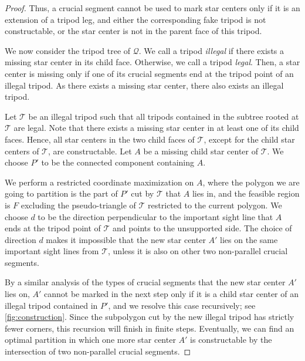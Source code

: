 \documentclass{theoretics}
\begin{document}
\begin{proof}
Thus, a crucial segment cannot be used to mark star centers only if it is an extension of a tripod leg, and either the corresponding fake tripod is not constructable, or the star center is not in the parent face of this tripod. 

We now consider the tripod tree of $\mathcal{Q}$. 
We call a tripod \emph{illegal} if there exists a missing star center in its child face. 
Otherwise, we call a tripod \emph{legal}. 
Then, a star center is missing only if one of its crucial segments end at the tripod point of an illegal tripod. 
As there exists a missing star center, there also exists an illegal tripod. 

Let $\mathcal{T}$ be an illegal tripod such that all tripods contained in the subtree rooted at $\mathcal{T}$ are legal. 
Note that there exists a missing star center in at least one of its child faces. 
Hence, all star centers in the two child faces of $\mathcal{T}$, except for the child star centers of $\mathcal{T}$, are constructable. 
Let $A$ be a missing child star center of $\mathcal{T}$. 
We choose $P'$ to be the connected component containing $A$. 

We perform a restricted coordinate maximization on $A$, where the polygon we are going to partition is the part of $P'$ cut by $\mathcal{T}$ that $A$ lies in, and the feasible region is $F$ excluding the pseudo-triangle of $\mathcal{T}$ restricted to the current polygon. 
We choose $d$ to be the direction perpendicular to the important sight line that $A$ ends at the tripod point of $\mathcal{T}$ and points to the unsupported side. 
The choice of direction $d$ makes it impossible that the new star center $A'$ lies on the same important sight lines from $\mathcal{T}$, unless it is also on other two non-parallel crucial segments.

By a similar analysis of the types of crucial segments that the new star center $A'$ lies on, $A'$ cannot be marked in the next step only if it is a child star center of an illegal tripod contained in $P'$, and we resolve this case recursively; see \cref{fig:construction}. Since the subpolygon cut by the new illegal tripod has strictly fewer corners, this recursion will finish in finite steps. Eventually, we can find an optimal partition in which one more star center $A'$ is constructable by the intersection of two non-parallel crucial segments. 
\end{proof}
\end{document}
